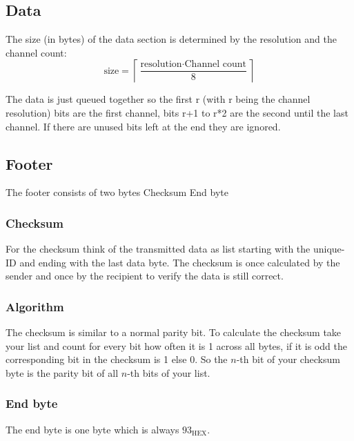\documentclass{report}
\begin{document}
  \subsection{Data}
    The size (in bytes) of the data section is determined by
    the resolution and the channel count:
    \begin{equation}
        \text{size} = \left\lceil{\frac{\text{resolution} \cdot \text{Channel count}}{8}} \right\rceil
    \end{equation}

   The data is just queued together so the first r (with r being the channel
   resolution) bits are the first channel, bits r+1 to r*2 are the second
   until the last channel. If there are unused bits left at the end they are
   ignored.

  \subsection{Footer}
    The footer consists of two bytes Checksum End byte

    \subsubsection{Checksum}
     For the checksum think of the transmitted data as list starting with the
     unique-ID and ending with the last data byte. The checksum is once
     calculated by the sender and once by the recipient to verify the data is
     still correct.

    \subsubsection{Algorithm}
     The checksum is similar to a normal parity bit. To calculate the checksum
     take your list and count for every bit how often it is 1 across all bytes,
     if it is odd the corresponding bit in the checksum is 1 else 0.
     So the $n$-th bit of your checksum byte is the parity bit of all $n$-th
     bits of your list.

    \subsubsection{End byte}
     The end byte is one byte which is always $93_\text{HEX}$.
\end{document}
